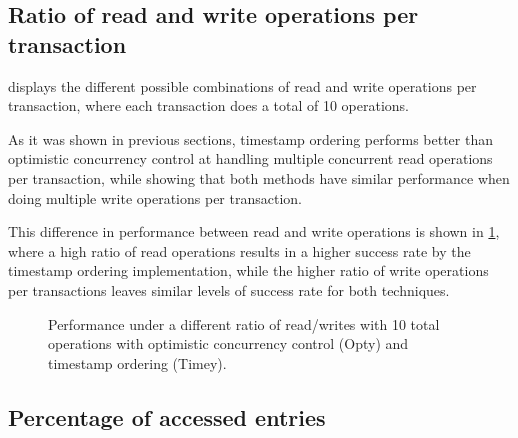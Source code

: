 \documentclass[a4paper, 10pt]{article}
\begin{document}
\subsection{Ratio of read and write operations per transaction}

 displays the different possible combinations of read and write operations per transaction, where each transaction does a total of 10 operations.

As it was shown in previous sections, timestamp ordering performs better than optimistic concurrency control at handling multiple concurrent read operations per transaction, while showing that both methods have similar performance when doing multiple write operations per transaction.

This difference in performance between read and write operations is shown in \cref{fig:tratio}, where a high ratio of read operations results in a higher success rate by the timestamp ordering implementation, while the higher ratio of write operations per transactions leaves similar levels of success rate for both techniques.

\begin{figure}[htp]
\begin{center}
\caption{Performance under a different ratio of read/writes with 10 total operations with optimistic concurrency control (Opty) and timestamp ordering (Timey).}
\label{fig:tratio}
\end{center}
\end{figure}

\subsection{Percentage of accessed entries} \label{sec:timey-subsets}
\end{document}
